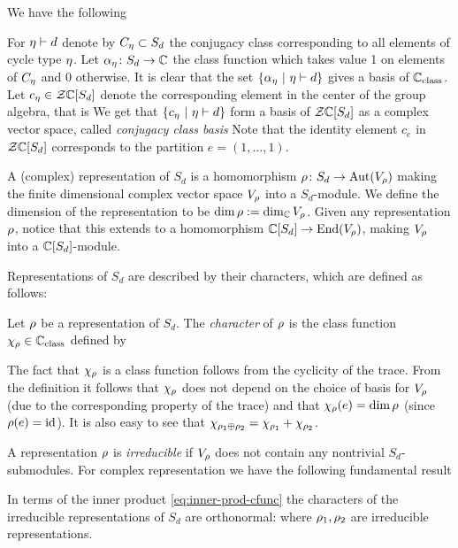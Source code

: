 \documentclass[../main/main.tex]{subfiles}
\begin{document}
We have the following

\begin{lemma}[{\cite[§§3.4]{FH}}]
\end{lemma}

For $\eta\vdash d$ denote by $C_\eta\subset S_d$ the conjugacy class corresponding to all elements of cycle type $\eta$.  Let $\alpha_\eta\colon S_d\to\mathbb C$ the class function which takes value 1 on elements of $C_\eta$ and 0 otherwise. It is clear that the set $\{\alpha_\eta\ |\ \eta\vdash d\}$ gives a basis of $\mathbb C_{\text{class}}$. Let $c_\eta\in\mathcal Z\mathbb C[S_d]$ denote the corresponding element in the center of the group algebra, that is 
We get that $\{c_\eta\ |\ \eta\vdash d\}$ form a basis of $\mathcal Z\mathbb C[S_d]$ as a complex vector space, called \emph{conjugacy class basis}
Note that the identity element $c_e$ in $\mathcal Z\mathbb C[S_d]$ corresponds to the partition $e=(1,\ldots,1)$. 


A (complex) representation of $S_d$ is a homomorphism $\rho\colon S_d\to\operatorname{Aut}(V_\rho)$ making the finite dimensional complex vector space $V_\rho$ into a $S_d$-module. We define the dimension of the representation to be $\dim \rho:=\dim_\mathbb C V_\rho$. Given any representation $\rho$, notice that this extends to a homomorphism $\mathbb C [S_d]\to\operatorname{End}(V_\rho)$, making $V_\rho$ into a $\mathbb C [S_d]$-module. 

Representations of $S_d$ are described by their characters, which are defined as follows:

\begin{definition}
	Let $\rho$ be a representation of $S_d$. The \emph{character} of $\rho$ is the class function $\chi_\rho\in\mathbb C_{\text{class}}$ defined by
	\deq{\c_\r(\s):=\tr(\r(\s))}
\end{definition}

The fact that $\chi_\rho$ is a class function follows from the cyclicity of the trace. From the definition it follows that $\chi_\rho$ does not depend on the choice of basis for $V_\rho$ (due to the corresponding property of the trace) and that $\chi_\rho(e)=\dim \rho$ (since $\rho(e)=\textrm{id}$). It is also easy to see that $\chi_{\rho_1\oplus\rho_2}=\chi_{\rho_1}+\chi_{\rho_2}$. 




A representation $\rho$ is \emph{irreducible} if $V_\rho$ does not contain any nontrivial $S_d$-submodules. For complex representation we have the following fundamental result
\begin{theorem}[{\cite[Thm. 2.12]{FH}}]
	In terms of the inner product \eqref{eq:inner-prod-cfunc} the characters of the irreducible representations of $S_d$ are orthonormal:
	where $\rho_1,\rho_2$ are irreducible representations.  
\end{theorem}
\end{document}
